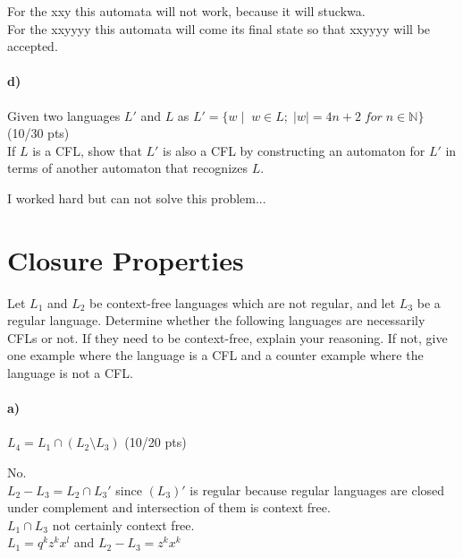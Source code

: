 \documentclass[a4paper,12pt]{article}
\begin{document}
\begin{tcolorbox}
For the xxy this automata will not work, because it will stuckwa.\\
For the xxyyyy this automata will come its final state so that xxyyyy will be accepted.
\end{tcolorbox}

\paragraph{d)} Given two languages $L'$ and $L$ as $L'=\{w \mid \; w\in L; \; |w|=4n+2 \; for\; n\in \mathbb{N} \}$
\hfill \small{(10/30 pts)} \\
If $L$ is a CFL, show that $L'$ is also a CFL by constructing an automaton for $L'$ in terms of another automaton that recognizes $L$. \\


\begin{tcolorbox}
I worked hard but can not solve this problem...
\end{tcolorbox}






\newpage
\section{Closure Properties \hfill {}}

Let $L_1$ and $L_2$ be context-free languages which are not regular, and let $L_3$ be a regular language. Determine whether the following languages are necessarily CFLs or not. If they need to be context-free, explain your reasoning. If not, give one example where the language is a CFL and a counter example where the language is not a CFL. \\

\paragraph{a)} $L_4 = L_1 \cap (L_2 \setminus L_3)$ \hfill \small{(10/20 pts)} \\

\begin{tcolorbox}
No. \\ $L_2 - L_3 = L_2 \cap L_3'$   since $(L_3)'$ is regular because regular languages are closed under complement and intersection of them is context free. \\
$ L_1 \cap L_3$ not certainly context free. \\
$ L_1 = q^k z^k x^l $  and $L_2 - L_3 =z^k x^k $
\end{tcolorbox}
\end{document}
